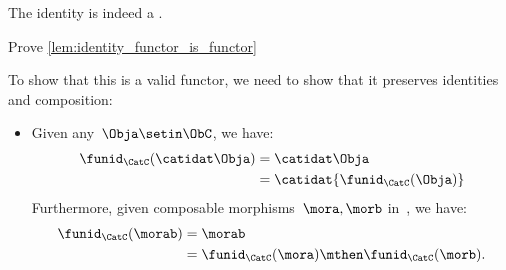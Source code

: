 \begin{lemma}
    \label{lem:identity_functor_is_functor}
    The identity  is indeed a .
\end{lemma}

\begin{exercise}
    Prove \cref{lem:identity_functor_is_functor}
\end{exercise}
\begin{solution}
    To show that this is a valid functor, we need to show that it preserves identities and composition:
    \begin{itemize}
        \item Given any~$\Obja \setin \ObC$, we have:
              \begin{equation}
                  \begin{aligned}
                      \funid_{\CatC}(\catidat\Obja) & =\catidat\Obja \\
                                                    & =\catidat{\funid_{\CatC}(\Obja)}
                  \end{aligned}
              \end{equation}
              Furthermore, given composable morphisms~$\mora,\morb$ in~\CatC, we have:
              \begin{equation}
                  \begin{aligned}
                      \funid_{\CatC}(\morab) & =\morab \\
                                             & =\funid_{\CatC}(\mora)\mthen \funid_{\CatC} (\morb).
                  \end{aligned}
              \end{equation}
    \end{itemize}
\end{solution}
